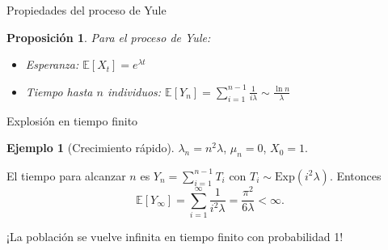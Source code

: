 \documentclass[aspectratio=169]{beamer}
\theoremstyle{plain}
\newtheorem{proposicion}{Proposición}
\theoremstyle{definition}
\newtheorem{ejemplo}{Ejemplo}
\newcommand{\E}{\mathbb{E}}
\newcommand{\1}{\mathbf{1}}
\begin{document}
\begin{frame}{Propiedades del proceso de Yule}
  \begin{proposicion}
    Para el proceso de Yule:
    \begin{itemize}
      \item Esperanza: $\E[X_t] = e^{\lambda t}$
      \item Tiempo hasta $n$ individuos: $\displaystyle\E[Y_n] = \sum_{i=1}^{n-1} \frac{1}{i\lambda} \sim \frac{\ln n}{\lambda}$
    \end{itemize}
  \end{proposicion}
  
  \begin{center}
  \end{center}
\end{frame}

\begin{frame}{Explosión en tiempo finito}
  \begin{ejemplo}[Crecimiento rápido]
    $\lambda_n = n^2\lambda$, $\mu_n = 0$, $X_0 = 1$.
  \end{ejemplo}
  
  El tiempo para alcanzar $n$ es $Y_n = \sum_{i=1}^{n-1} T_i$ con $T_i \sim \text{Exp}(i^2\lambda)$. Entonces
  \[ \E[Y_\infty] = \sum_{i=1}^\infty \frac{1}{i^2\lambda} = \frac{\pi^2}{6\lambda} < \infty. \]
  
  \begin{center}
  \end{center}
  
  \begin{center}
    ¡La población se vuelve infinita en tiempo finito con probabilidad 1!
  \end{center}
\end{frame}
\end{document}
